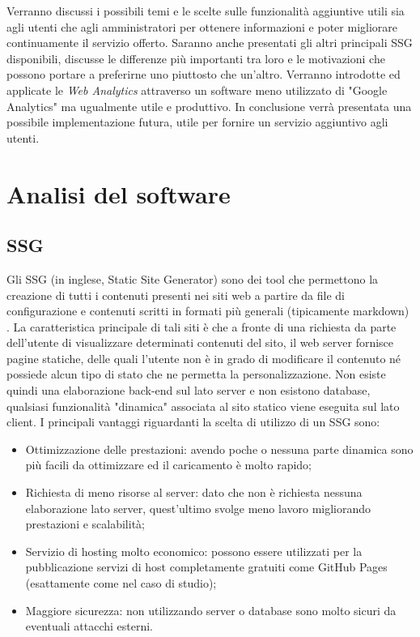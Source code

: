 \documentclass[target=bach,aauheader=]{thud}
\begin{document}
Verranno discussi i possibili temi e le scelte sulle funzionalità aggiuntive utili sia agli utenti che agli amministratori per ottenere informazioni e poter migliorare continuamente il servizio offerto.  
\newline \newline
Saranno anche presentati gli altri principali SSG disponibili, discusse le differenze più importanti tra loro e le motivazioni che possono portare a preferirne uno piuttosto che un'altro.  
Verranno introdotte ed applicate le \textit{Web Analytics} attraverso un software meno utilizzato di "Google Analytics" ma ugualmente utile e produttivo.
In conclusione verrà presentata una possibile implementazione futura, utile per fornire un servizio aggiuntivo agli utenti.   

\chapter{Analisi del software}

\section{SSG}\label{sec:SSG}
Gli SSG (in inglese, Static Site Generator) sono dei tool che permettono la creazione di tutti i contenuti presenti nei siti web a partire da file di configurazione e contenuti scritti in formati più generali (tipicamente markdown) \cite{camden2017working}.
La caratteristica principale di tali siti è che a fronte di una richiesta da parte dell'utente di visualizzare determinati contenuti del sito, il web server fornisce pagine statiche, delle quali l'utente non è in grado di modificare il contenuto né possiede alcun tipo di stato che ne permetta la personalizzazione. Non esiste quindi una elaborazione back-end sul lato server e non esistono database, qualsiasi funzionalità "dinamica" associata al sito statico viene eseguita sul lato client. \newline
I principali vantaggi riguardanti la scelta di utilizzo di un SSG sono:
\begin{itemize}
\item Ottimizzazione delle prestazioni: avendo poche o nessuna parte dinamica sono più facili da ottimizzare ed il caricamento è molto rapido;
\item Richiesta di meno risorse al server: dato che non è richiesta nessuna elaborazione lato server, quest'ultimo svolge meno lavoro migliorando prestazioni e scalabilità;
\item Servizio di hosting molto economico: possono essere utilizzati per la pubblicazione servizi di host completamente gratuiti come GitHub Pages (esattamente come nel caso di studio);
\item Maggiore sicurezza: non utilizzando server o database sono molto sicuri da eventuali attacchi esterni.
\end{itemize}
\end{document}
